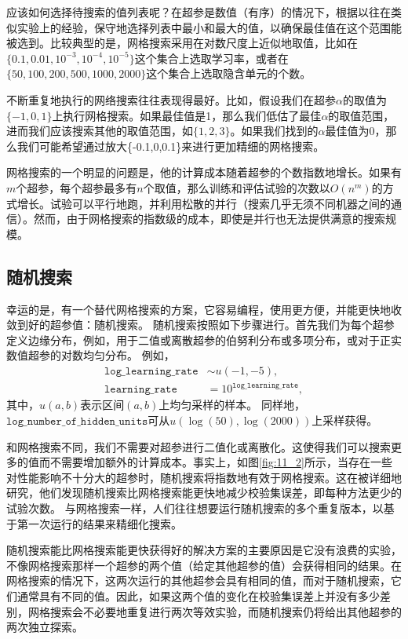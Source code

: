 应该如何选择待搜索的值列表呢？在超参是数值（有序）的情况下，根据以往在类似实验上的经验，保守地选择列表中最小和最大的值，以确保最佳值在这个范围能被选到。比较典型的是，网格搜索采用在对数尺度上近似地取值，比如在$\{0.1,0.01,10^{-3},10^{-4},10^{-5}\}$这个集合上选取学习率，或者在$\{50,100,200,500,1000,2000\}$这个集合上选取隐含单元的个数。

不断重复地执行的网络搜索往往表现得最好。比如，假设我们在超参$\alpha$的取值为$\{-1,0,1\}$上执行网格搜索。如果最佳值是1，那么我们低估了最佳$\alpha$的取值范围，进而我们应该搜索其他的取值范围，如$\{1,2,3\}$。如果我们找到的$\alpha$最佳值为0，那么我们可能希望通过放大\{-0.1,0,0.1\}来进行更加精细的网格搜索。

网格搜索的一个明显的问题是，他的计算成本随着超参的个数指数地增长。如果有$m$个超参，每个超参最多有$n$个取值，那么训练和评估试验的次数以$O(n^m)$的方式增长。试验可以平行地跑，并利用松散的并行（搜索几乎无须不同机器之间的通信）。然而，由于网格搜索的指数级的成本，即使是并行也无法提供满意的搜索规模。

\subsection{随机搜索}
\label{sec:11.4.4}

幸运的是，有一个替代网格搜索的方案，它容易编程，使用更方便，并能更快地收敛到好的超参值：随机搜索。
随机搜索按照如下步骤进行。首先我们为每个超参定义边缘分布，例如，用于二值或离散超参的伯努利分布或多项分布，或对于正实数值超参的对数均匀分布。 例如，
\begin{align}
        \texttt{log\_learning\_rate} &\sim u(-1, -5), \\
        \texttt{learning\_rate} &= 10^{\texttt{log\_learning\_rate}},
\end{align}
其中，$u(a,b)$表示区间$(a,b)$上均匀采样的样本。
同样地，$\texttt{log\_number\_of\_hidden\_units}$可从$u(\log(50), \log(2000))$上采样获得。

和网格搜索不同，我们不需要对超参进行二值化或离散化。这使得我们可以搜索更多的值而不需要增加额外的计算成本。事实上，如图\ref{fig:11_2}所示，当存在一些对性能影响不十分大的超参时，随机搜索将指数地有效于网格搜索。这在被详细地研究，他们发现随机搜索比网格搜索能更快地减少校验集误差，即每种方法更少的试验次数。
与网格搜索一样，人们往往想要运行随机搜索的多个重复版本，以基于第一次运行的结果来精细化搜索。

随机搜索能比网格搜索能更快获得好的解决方案的主要原因是它没有浪费的实验，不像网格搜索那样一个超参的两个值（给定其他超参的值）会获得相同的结果。在网格搜索的情况下，这两次运行的其他超参会具有相同的值，而对于随机搜索，它们通常具有不同的值。因此，如果这两个值的变化在校验集误差上并没有多少差别，网格搜索会不必要地重复进行两次等效实验，而随机搜索仍将给出其他超参的两次独立探索。

